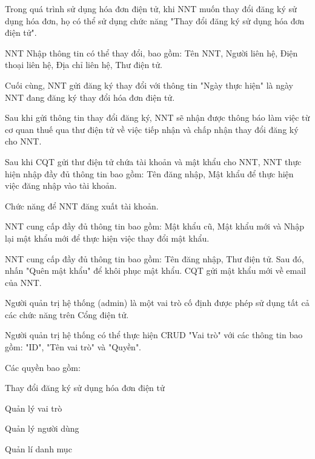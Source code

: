 
Trong quá trình sử dụng hóa đơn điện tử, khi NNT muốn thay đổi đăng ký sử dụng hóa đơn, họ có thể sử dụng chức năng "Thay đổi đăng ký sử dụng hóa đơn điện tử".

NNT Nhập thông tin có thể thay đổi, bao gồm: Tên NNT, Người liên hệ, Điện thoại liên hệ, Địa chỉ liên hệ, Thư điện tử.

Cuối cùng, NNT gửi đăng ký thay đổi với thông tin "Ngày thực hiện" là ngày NNT đang đăng ký thay đổi hóa đơn điện tử.

Sau khi gửi thông tin thay đổi đăng ký, NNT sẽ nhận được thông báo làm việc từ cơ quan thuế qua thư điện tử về việc tiếp nhận và chấp nhận thay đổi đăng ký cho NNT.


Sau khi CQT gửi thư điện tử chứa tài khoản và mật khẩu cho NNT, NNT thực hiện nhập đầy đủ thông tin bao gồm: Tên đăng nhập, Mật khẩu để thực hiện việc đăng nhập vào tài khoản.


Chức năng để NNT đăng xuất tài khoản.


NNT cung cấp đầy đủ thông tin bao gồm: Mật khẩu cũ, Mật khẩu mới và Nhập lại mật khẩu mới để thực hiện việc thay đổi mật khẩu.


NNT cung cấp đầy đủ thông tin bao gồm: Tên đăng nhập, Thư điện tử. Sau đó, nhấn "Quên mật khẩu" để khôi phục mật khẩu. CQT gửi mật khẩu mới về email của NNT.



Người quản trị hệ thống (admin) là một vai trò cố định được phép sử dụng tất cả các chức năng trên Cổng điện tử.

Người quản trị hệ thống có thể thực hiện CRUD "Vai trò" với các thông tin bao gồm: "ID", "Tên vai trò" và "Quyền".

Các quyền bao gồm:

Thay đổi đăng ký sử dụng hóa đơn điện tử

Quản lý vai trò

Quản lý người dùng

Quản lí danh mục

